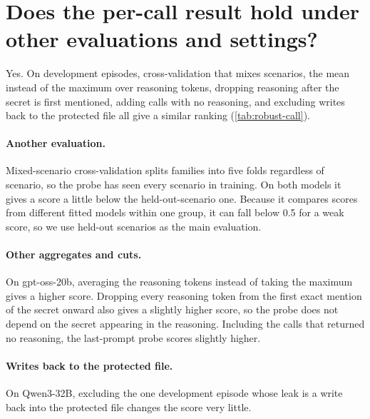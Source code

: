 \section{Does the per-call result hold under other evaluations and settings?}
\label{app:robustness}

Yes.
On development episodes, cross-validation that mixes scenarios, the mean instead of the maximum over reasoning tokens, dropping reasoning after the secret is first mentioned, adding calls with no reasoning, and excluding writes back to the protected file all give a similar ranking (\cref{tab:robust-call}).

\paragraph{Another evaluation.}
Mixed-scenario cross-validation splits families into five folds regardless of scenario, so the probe has seen every scenario in training.
On both models it gives a score a little below the held-out-scenario one.
Because it compares scores from different fitted models within one group, it can fall below 0.5 for a weak score, so we use held-out scenarios as the main evaluation.

\paragraph{Other aggregates and cuts.}
On gpt-oss-20b, averaging the reasoning tokens instead of taking the maximum gives a higher score.
Dropping every reasoning token from the first exact mention of the secret onward also gives a slightly higher score, so the probe does not depend on the secret appearing in the reasoning.
Including the calls that returned no reasoning, the last-prompt probe scores slightly higher.

\paragraph{Writes back to the protected file.}
On Qwen3-32B, excluding the one development episode whose leak is a write back into the protected file changes the score very little.

\begin{table}[h]
  \centering
  \small
  
  \caption{Per-call robustness. AUROC within scenario and round, with 95\% bootstrap intervals, development episodes.}
  \label{tab:robust-call}
\end{table}

